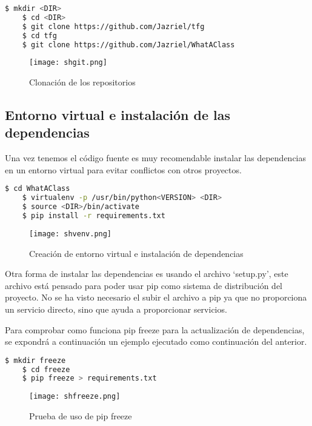 \begin{lstlisting}[language=bash]
    $ mkdir <DIR>
    $ cd <DIR>
    $ git clone https://github.com/Jazriel/tfg
    $ cd tfg
    $ git clone https://github.com/Jazriel/WhatAClass
\end{lstlisting}

\begin{figure}
	\centering
	\texttt{[image: shgit.png]}
	\caption{Clonación de los repositorios}\label{fig:shgit.png}
\end{figure}


\subsection{Entorno virtual e instalación de las dependencias}

Una vez tenemos el código fuente es muy recomendable instalar las dependencias en un entorno virtual para evitar conflictos con otros proyectos.

\begin{lstlisting}[language=bash]
    $ cd WhatAClass
    $ virtualenv -p /usr/bin/python<VERSION> <DIR>
    $ source <DIR>/bin/activate
    $ pip install -r requirements.txt
\end{lstlisting}
\begin{figure}
	\centering
	\texttt{[image: shvenv.png]}
	\caption{Creación de entorno virtual e instalación de dependencias}\label{fig:shvenv.png}
\end{figure}

Otra forma de instalar las dependencias es usando el archivo `setup.py', este archivo está pensado para poder usar pip como sistema de distribución del proyecto. No se ha visto necesario el subir el archivo a pip ya que no proporciona un servicio directo, sino que ayuda a proporcionar servicios. 

Para comprobar como funciona pip freeze para la actualización de dependencias, se expondrá a continuación un ejemplo ejecutado como continuación del anterior.

\begin{lstlisting}[language=bash]
    $ mkdir freeze
    $ cd freeze
    $ pip freeze > requirements.txt
\end{lstlisting}

\begin{figure}
	\centering
	\texttt{[image: shfreeze.png]}
	\caption{Prueba de uso de pip freeze}\label{fig:shfreeze.png}
\end{figure}


